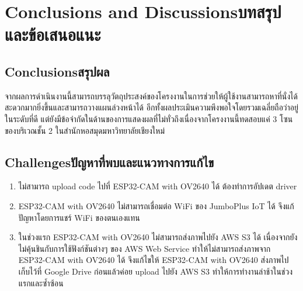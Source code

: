 \chapter{\ifenglish Conclusions and Discussions\else บทสรุปและข้อเสนอแนะ\fi}

\section{\ifenglish Conclusions\else สรุปผล\fi}

จากผลการดำเนินงานนี้สามารถบรรลุวัตถุประสงค์ของโครงงานในการช่วยให้ผู้ใช้งานสามารถหาที่นั่งได้สะดวกมากยิ่งขึ้นและสามารถวางแผนล่วงหน้าได้ อีกทั้งผลประเมินความพึงพอใจโดยรวมเฉลี่ยถือว่าอยู่ในระดับที่ดี
แต่ยังมีข้อจำกัดในด้านของการแสดงผลที่ไม่ทั่วถึงเนื่องจากโครงงานนี้ทดสอบแค่ 3 โซนของบริเวณชั้น 2 ในสำนักหอสมุดมหาวิทยาลัยเชียงใหม่

\section{\ifenglish Challenges\else ปัญหาที่พบและแนวทางการแก้ไข\fi}

\begin{enumerate}
    \item ไม่สามารถ upload code ไปที่ ESP32-CAM with OV2640 ได้ ต้องทำการอัปเดต driver 
    \item ESP32-CAM with OV2640 ไม่สามารถเชื่อมต่อ WiFi ของ JumboPlus IoT ได้ จึงแก้ปัญหาโดยการแชร์ WiFi ของตนเองแทน
    \item ในช่วงแรก ESP32-CAM with OV2640 ไม่สามารถส่งภาพไปยัง AWS S3 ได้ เนื่องจากยังไม่คุ้นชินกับการใช้ฟังก์ชันต่างๆ ของ AWS Web Service 
    ทำให้ไม่สามารถส่งภาพจาก ESP32-CAM with OV2640 ได้ จึงแก้ไขให้ ESP32-CAM with OV2640 ส่งภาพไปเก็บไว้ที่ Google Drive ก่อนแล้วค่อย upload ไปยัง AWS S3 ทำให้การทำงานล่าช้าในช่วงแรกและซ้ำซ้อน
\end{enumerate}

